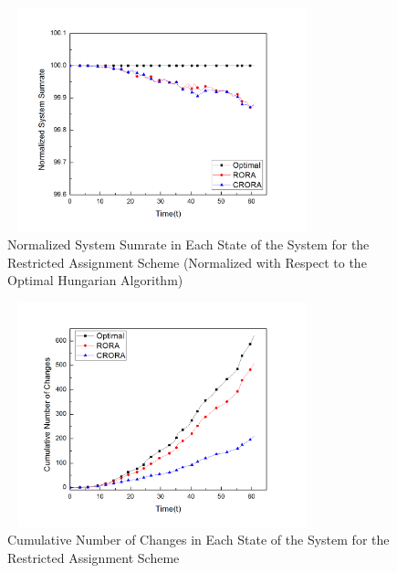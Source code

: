 \documentclass[times]{dacauth}
\begin{document}
\begin{figure}[t]
	{ %
		\setlength{\fboxsep}{1.5pt}%
		\setlength{\fboxrule}{1.5pt}%
		\centering
		\includegraphics[width=90mm,height=65mm]{Graph/Normalizedsumrateresjournal.jpg}
		\caption{Normalized System Sumrate in Each State of the System for the Restricted Assignment Scheme (Normalized with Respect to the Optimal Hungarian Algorithm)} \label{fig:sum_r_N}
	}
\end{figure}

\begin{figure}[t]
	{ %
		\setlength{\fboxsep}{1.5pt}%
		\setlength{\fboxrule}{1.5pt}%
		\centering
		\includegraphics[width=90mm,height=65mm]{Graph/nocresJournal.jpg}
		\caption{Cumulative Number of Changes in Each State of the System for the Restricted Assignment Scheme} \label{fig:noc_r}
		\vspace{-.5cm}
	}
\end{figure}
\end{document}
